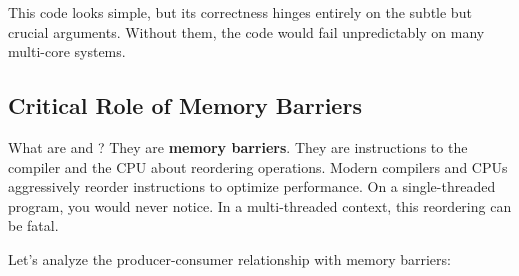This code looks simple, but its correctness hinges entirely on the subtle but crucial  arguments. Without them, the code would fail unpredictably on many multi-core systems.

\subsection{Critical Role of Memory Barriers}
\label{subsec:memory_barriers}

What are  and ? They are \textbf{memory barriers}. They are instructions to the compiler and the CPU about reordering operations. Modern compilers and CPUs aggressively reorder instructions to optimize performance. On a single-threaded program, you would never notice. In a multi-threaded context, this reordering can be fatal.

Let's analyze the producer-consumer relationship with memory barriers:

